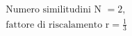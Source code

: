 \documentclass[preview]{standalone}
\begin{document}
\begin{align*}
&\text{Numero similitudini N } = 2 \text{,} \\& \text{fattore di riscalamento r} = \frac{1}{3}
\end{align*}
\end{document}
